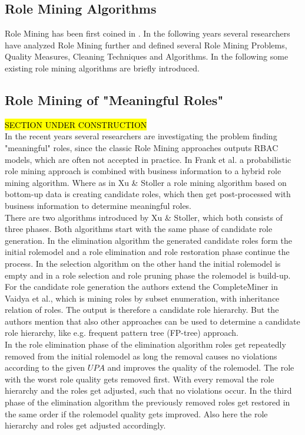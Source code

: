 \subsection{Role Mining Algorithms}
Role Mining has been first coined in \cite{Kuhlmann}. In the following years several researchers have analyzed Role Mining further and defined several Role Mining Problems, Quality Measures, Cleaning Techniques and Algorithms. In the following some existing role mining algorithms are briefly introduced.\\
\subsection{Role Mining of "Meaningful Roles"}
\label{sec:meaningfulRoles}
\hl{SECTION UNDER CONSTRUCTION}\\
In the recent years several researchers are investigating the problem finding "meaningful" roles, since the classic Role Mining approaches outputs RBAC models, which are often not accepted in practice. In Frank et al.\cite{Frank} a probabilistic role mining approach is combined with business information to a hybrid role mining algorithm. Where as in Xu \& Stoller\cite{Xu} a role mining algorithm based on bottom-up data is creating candidate roles, which then get post-processed with business information to determine meaningful roles.\\
\newline
There are two algorithms introduced by Xu \& Stoller\cite{Xu}, which both consists of three phases. Both algorithms start with the same phase of candidate role generation. In the elimination algorithm the generated candidate roles form the initial rolemodel and a role elimination and role restoration phase continue the process. In the selection algorithm on the other hand the initial rolemodel is empty and in a role selection and role pruning phase the rolemodel is build-up.\\
For the candidate role generation the authors extend the CompleteMiner in Vaidya et al.\cite{Vaidya:2006:RMR:1180405.1180424}, which is mining roles by subset enumeration, with inheritance relation of roles. The output is therefore a candidate role hierarchy. But the authors mention that also other approaches can be used to determine a candidate role hierarchy, like e.g. frequent pattern tree (FP-tree) approach\cite{Han}.\\
In the role elimination phase of the elimination algorithm roles get repeatedly removed from the initial rolemodel as long the removal causes no violations according to the given $UPA$ and improves the quality of the rolemodel. The role with the worst role quality gets removed first. With every removal the role hierarchy and the roles get adjusted, such that no violations occur. In the third phase of the elimination algorithm the previously removed roles get restored in the same order if the rolemodel quality gets improved. Also here the role hierarchy and roles get adjusted accordingly.\\

